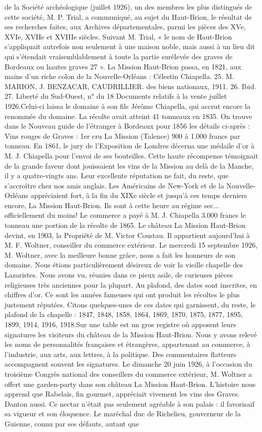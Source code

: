 de la Société archéologique (juillet 1926), un des membres les plus distingués de cette société, M. P. Trial, a communiqué, au sujet du Haut-Brion, le résultat de ses recherches faites, aux Archives départementales, parmi les pièces des XVe, XVIe, XVIIe et XVIIIe siècles. Suivant M. Trial, « le nom de Haut-Brion s'appliquait autrefois non seulement à une maison noble, mais aussi à un lieu dit qui s'étendait vraisemblablement à toute la partie surélevée des graves de Bordeaux ou hautes graves 27 ». La Mission Haut-Brion passa, en 1821, aux mains d'un riche colon de la Nouvelle-Orléans : Célestin Chiapella. 25. M. MARION, J. BENZACAR, CAUDRILLIER. des biens nationaux, 1911. 26. Ibid. 27. Liberté du Sud-Ouest, n° du 18 Documents relatifs à la vente juillet 1926.Celui-ci laissa le domaine à son fils Jérôme Chiapella, qui accrut encore la renommée du domaine. La récolte avait atteint 41 tonneaux en 1835. On trouve dans le Nouveau guide de l'étranger à Bordeaux pour 1856 les détails ci-après : Vins rouges de Graves : 1er cru La Mission (Talence) 900 à 1.000 francs par tonneau. En 1861, le jury de l'Exposition de Londres décerna une médaile d'or à M. J. Chiapella pour l'envoi de ses bouteilles. Cette haute récompense témoignait de la grande faveur dont jouissaient les vins de la Mission au delà de la Manche, il y a quatre-vingts ans. Leur excellente réputation ne fait, du reste, que s'accroître chez nos amis anglais. Les Américains de New-York et de la Nouvelle-Orléans appréciaient fort, à la fin du XIXe siècle et jusqu'à ces temps derniers encore, La Mission Haut-Brion. Ils sont à cette heure au régime sec... officiellement du moins! Le commerce a payé à M. J. Chiapella 3.000 francs le tonneau une portion de la récolte de 1865. Le château La Mission Haut-Brion devint, en 1903, la Propriété de M. Victor Coustau. Il appartient aujourd'hui à M. F. Woltner, conseiller du commerce extérieur. Le mercredi 15 septembre 1926, M. Woltner, avec la meilleure bonne grâce, nous a fait les honneurs de son domaine. Nous étions particulièrement désireux de voir la vieille chapelle des Lazaristes. Nous avons vu, réunies dans ce pieux asile, de curieuses pièces religieuses très anciennes pour la plupart. Au plafond, des dates sont inscrites, en chiffres d'or. Ce sont les années fameuses qui ont produit les récoltes le plus justement réputées. Citons quelques-unes de ces dates qui garnissent, du reste, le plafond de la chapelle : 1847, 1848, 1858, 1864, 1869, 1870, 1875, 1877, 1895, 1899, 1914, 1916, 1918.Sur une table est un gros registre où apposent leurs signatures les visiteurs du château de la Mission Haut-Brion. Nous y avons relevé les noms de personnalités françaises et étrangères, appartenant au commerce, à l'industrie, aux arts, aux lettres, à la politique. Des commentaires flatteurs accompagnent souvent les signatures. Le dimanche 20 juin 1926, à l'occasion du troisième Congrès national des conseillers du commerce extérieur, M. Woltner a offert une garden-party dans son château La Mission Haut-Brion. L'histoire nous apprend que Rabelais, fin gourmet, appréciait vivement les vins des Graves. Danton aussi. Ce nectar n'était pas seulement agréable à son palais : il favorisaif sa vigueur et son éloquence. Le maréchal duc de Richelieu, gouverneur de la Guienne, connu par ses défauts, autant que 